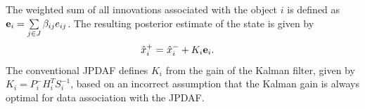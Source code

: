 \documentclass[letterpaper, 10pt, conference]{ieeeconf}
\newcommand{\refeqn}[1]{(\ref{eqn:#1})}
\renewcommand{\Re}{\ensuremath{\mathbb{R}}}
\begin{document}
The weighted sum of all innovations associated with the object $i$ is defined as ${\bf{e}}_{i}={\sum\limits_{j\in J} \beta_{ij}e_{ij}}$.
The resulting posterior estimate of the state is given by
\begin{align}
\hat x^+_{i}=&\ \hat x^-_{i}+K_{i}{\bf{e}}_{i}.\label{eqn:KalEst}
\end{align}
The conventional JPDAF defines $K_i$ from the gain of the Kalman filter, given by $K_i=P^-_iH_i^TS_i^{-1}$, based on an incorrect assumption that the Kalman gain is always optimal for data association with the JPDAF.
%
%
%
%
\end{document}
